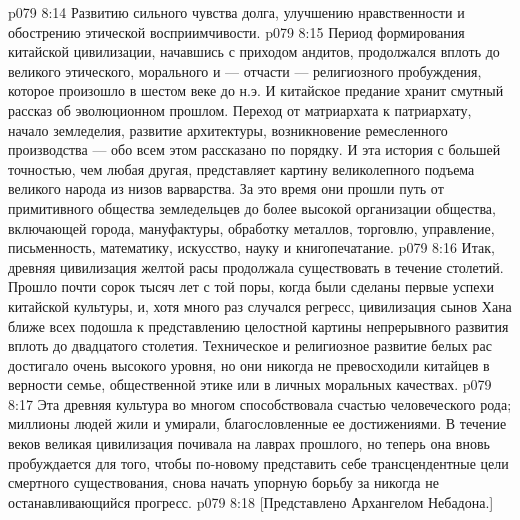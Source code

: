 \vs p079 8:14 \bibnobreakspace Развитию сильного чувства долга, улучшению нравственности и обострению этической восприимчивости.
\vs p079 8:15 \pc Период формирования китайской цивилизации, начавшись с приходом андитов, продолжался вплоть до великого этического, морального и --- отчасти --- религиозного пробуждения, которое произошло в шестом веке до н.э. И китайское предание хранит смутный рассказ об эволюционном прошлом. Переход от матриархата к патриархату, начало земледелия, развитие архитектуры, возникновение ремесленного производства --- обо всем этом рассказано по порядку. И эта история с большей точностью, чем любая другая, представляет картину великолепного подъема великого народа из низов варварства. За это время они прошли путь от примитивного общества земледельцев до более высокой организации общества, включающей города, мануфактуры, обработку металлов, торговлю, управление, письменность, математику, искусство, науку и книгопечатание.
\vs p079 8:16 Итак, древняя цивилизация желтой расы продолжала существовать в течение столетий. Прошло почти сорок тысяч лет с той поры, когда были сделаны первые успехи китайской культуры, и, хотя много раз случался регресс, цивилизация сынов Хана ближе всех подошла к представлению целостной картины непрерывного развития вплоть до двадцатого столетия. Техническое и религиозное развитие белых рас достигало очень высокого уровня, но они никогда не превосходили китайцев в верности семье, общественной этике или в личных моральных качествах.
\vs p079 8:17 Эта древняя культура во многом способствовала счастью человеческого рода; миллионы людей жили и умирали, благословленные ее достижениями. В течение веков великая цивилизация почивала на лаврах прошлого, но теперь она вновь пробуждается для того, чтобы по\hyp{}новому представить себе трансцендентные цели смертного существования, снова начать упорную борьбу за никогда не останавливающийся прогресс.
\vsetoff
\vs p079 8:18 [Представлено Архангелом Небадона.]
